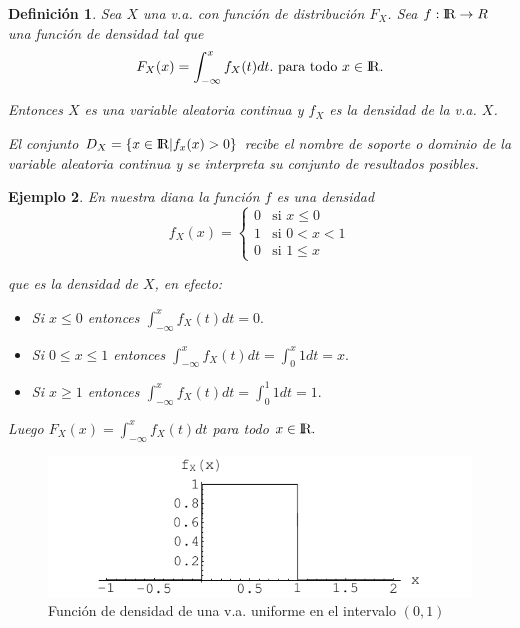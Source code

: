 \documentclass[12pt]{report}
\newtheorem{definition}{Definici\'on}
\newtheorem{example}[definition]{Ejemplo}
\def\R{I\!\!R}
\begin{document}
\begin{definition}

Sea $X$ una v.a. con función de distribución $F_X$. Sea $f:\mbox{I\kern-.2em\hbox{R}}\to\\R$ una función de
densidad tal que
$$F_X(x)=\int_{-\infty}^{x} f_X(t) dt.\mbox{ para todo } x\in\mbox{I\kern-.2em\hbox{R}}.$$

Entonces $X$ es una variable aleatoria continua y $f_X$ es la densidad de la v.a.  $X$.

El conjunto $D_X=\{x\in\mbox{I\kern-.2em\hbox{R}}| f_x(x)>0\}$ recibe el nombre de soporte o dominio de la
variable aleatoria continua y se interpreta su conjunto de resultados posibles.
\end{definition}

 \begin{example}
    En nuestra diana la función $f$ es una densidad
    $$f_{X}(x)=\left\{
    \begin{array}{ll}
        0 & \mbox{si } x\leq 0\\
        1 & \mbox{si } 0 < x < 1\\
        0 & \mbox{si } 1\leq x
     \end{array}\right.
    $$

     que    es la densidad de $X$, en efecto:

\begin{itemize}
\item Si $x \leq 0$ entonces $\int_{-\infty}^x f_X(t) dt = 0.$
\item  Si $0\leq x\leq 1$ entonces $\int_{-\infty}^x f_X(t) dt =
\int_{0}^x 1 dt = x.$
\item Si $x\geq 1$  entonces $\int_{-\infty}^x f_X(t) dt =
\int_{0}^1 1 dt = 1.$
\end{itemize}


Luego $F_X(x)=\int_{-\infty}^x f_X(t) dt$ para todo $x\in\mbox{I\kern-.2em\hbox{R}}.$

\end{example}

        \begin{figure}
       \begin{center} \includegraphics{densidaduniforme}
\end{center}
        \caption{Función de densidad de una v.a. uniforme en el intervalo
    $(0,1)$}
\end{figure}
\end{document}
